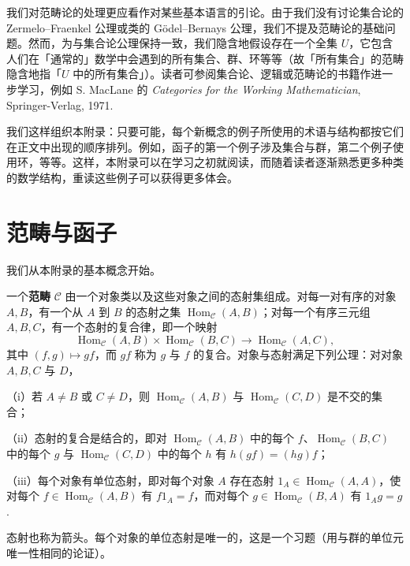 我们对范畴论的处理更应看作对某些基本语言的引论。由于我们没有讨论集合论的 Zermelo--Fraenkel 公理或类的 Gödel--Bernays 公理，我们不提及范畴论的基础问题。然而，为与集合论公理保持一致，我们隐含地假设存在一个全集 \(U\)，它包含人们在「通常的」数学中会遇到的所有集合、群、环等等（故「所有集合」的范畴隐含地指「\(U\) 中的所有集合」）。读者可参阅集合论、逻辑或范畴论的书籍作进一步学习，例如 S. MacLane 的 \textit{Categories for the Working Mathematician}, Springer-Verlag, 1971.

我们这样组织本附录：只要可能，每个新概念的例子所使用的术语与结构都按它们在正文中出现的顺序排列。例如，函子的第一个例子涉及集合与群，第二个例子使用环，等等。这样，本附录可以在学习之初就阅读，而随着读者逐渐熟悉更多种类的数学结构，重读这些例子可以获得更多体会。

\section{范畴与函子}

我们从本附录的基本概念开始。

\begin{definition}
一个\textbf{范畴} \(\mathcal{C}\) 由一个对象类以及这些对象之间的态射集组成。对每一对有序的对象 \(A, B\)，有一个从 \(A\) 到 \(B\) 的态射之集 \(\operatorname{Hom}_{\mathcal{C}}(A, B)\)；对每一个有序三元组 \(A, B, C\)，有一个态射的复合律，即一个映射
\[
\operatorname{Hom}_{\mathcal{C}}(A, B) \times \operatorname{Hom}_{\mathcal{C}}(B, C) \to \operatorname{Hom}_{\mathcal{C}}(A, C),
\]
其中 \((f, g) \mapsto gf\)，而 \(gf\) 称为 \(g\) 与 \(f\) 的复合。对象与态射满足下列公理：对对象 \(A, B, C\) 与 \(D\)，

（i）若 \(A \neq B\) 或 \(C \neq D\)，则 \(\operatorname{Hom}_{\mathcal{C}}(A, B)\) 与 \(\operatorname{Hom}_{\mathcal{C}}(C, D)\) 是不交的集合；

（ii）态射的复合是结合的，即对 \(\operatorname{Hom}_{\mathcal{C}}(A, B)\) 中的每个 \(f\)、\(\operatorname{Hom}_{\mathcal{C}}(B, C)\) 中的每个 \(g\) 与 \(\operatorname{Hom}_{\mathcal{C}}(C, D)\) 中的每个 \(h\) 有 \(h(gf) = (hg)f\)；

（iii）每个对象有单位态射，即对每个对象 \(A\) 存在态射 \(1_A \in \operatorname{Hom}_{\mathcal{C}}(A, A)\)，使对每个 \(f \in \operatorname{Hom}_{\mathcal{C}}(A, B)\) 有 \(f1_A = f\)，而对每个 \(g \in \operatorname{Hom}_{\mathcal{C}}(B, A)\) 有 \(1_Ag = g\).
\end{definition}

态射也称为箭头。每个对象的单位态射是唯一的，这是一个习题（用与群的单位元唯一性相同的论证）。

